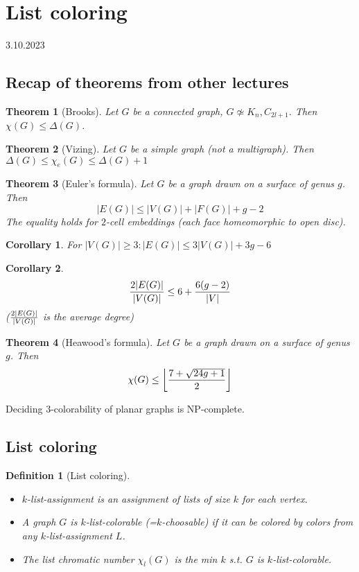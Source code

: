 \documentclass{article}
\newtheorem*{theorem}{Theorem}
\newtheorem*{definition}{Definition}
\newtheorem*{corollary}{Corollary}
\begin{document}
\newpage
\section{List coloring} %
3.10.2023

\subsection*{Recap of theorems from other lectures}

\begin{theorem}[Brooks]
	Let $G$ be a connected graph, $G \not \simeq K_n, C_{2l+1}$. Then
	$\chi(G) \le \Delta(G)$.
\end{theorem}

\begin{theorem}[Vizing]
	Let $G$ be a simple graph (not a multigraph). Then $\Delta(G) \le
	\chi_e(G) \le \Delta(G)+1$
\end{theorem}

\begin{theorem}[Euler's formula]
	Let $G$ be a graph drawn on a surface of genus $g$. Then
	$$ |E(G)| \le |V(G)| + |F(G)| + g - 2 $$
	The equality holds for $2$-cell embeddings (each face homeomorphic to
	open disc).
\end{theorem}

\begin{corollary}
	For $|V(G)| \ge 3: |E(G)| \le 3|V(G)| + 3g - 6$
\end{corollary}

\begin{corollary}
	$${{2|E(G)|}\over{|V(G)|}} \le 6 + {{6(g-2)}\over{|V|}}$$
	(${{2|E(G)|}\over{|V(G)|}}$ is the average degree)
\end{corollary}

\begin{theorem}[Heawood's formula]
	Let $G$ be a graph drawn on a surface of genus $g$. Then
	$$\chi(G) \le
	\left \lfloor {{7 + \sqrt{24g+1}}\over{2}} \right \rfloor$$
\end{theorem}

\noindent
Deciding $3$-colorability of planar graphs is NP-complete.

\subsection*{List coloring}

\begin{definition}[List coloring]
	~
	\begin{itemize}
		\item \emph{$k$-list-assignment} is an assignment of lists of
			size $k$ for each vertex.

		\item A graph $G$ is \emph{$k$-list-colorable} (=$k$-choosable)
			if it can be colored by colors from any
			$k$-list-assignment $L$.

		\item The list chromatic number $\chi_l(G)$ is the min $k$ s.t.
			$G$ is $k$-list-colorable.
	\end{itemize}
\end{definition}
\end{document}
